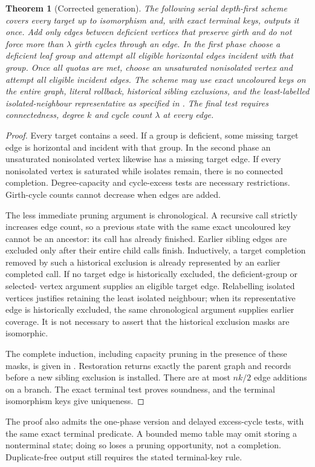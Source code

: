 \documentclass[11pt,a4paper]{article}
\newtheorem{theorem}{Theorem}
\begin{document}
\begin{theorem}[Corrected generation]\label{thm:generation}
The following serial depth-first scheme covers every target up to
isomorphism and, with exact terminal keys, outputs it once. Add only
edges between deficient vertices that preserve girth and do not force
more than $\lambda$ girth cycles through an edge. In the first phase
choose a \emph{deficient leaf group} and attempt all eligible horizontal
edges incident with that group. Once all quotas are met, choose an
unsaturated nonisolated vertex and attempt all eligible incident edges.
The scheme may use exact uncoloured keys on the entire graph, literal
rollback, historical sibling exclusions, and the least-labelled
isolated-neighbour representative as specified in \cite{algorithm}.
The final test requires connectedness, degree $k$ and cycle count
$\lambda$ at every edge.
\end{theorem}
\begin{proof}
Every target contains a seed. If a group is deficient, some missing
target edge is horizontal and incident with that group. In the second
phase an unsaturated nonisolated vertex likewise has a missing target
edge. If every nonisolated vertex is saturated while isolates remain,
there is no connected completion. Degree-capacity and cycle-excess tests
are necessary restrictions. Girth-cycle counts cannot decrease when
edges are added.

The less immediate pruning argument is chronological. A recursive call
strictly increases edge count, so a previous state with the same exact
uncoloured key cannot be an ancestor: its call has already finished.
Earlier sibling edges are excluded only after their entire child calls
finish. Inductively, a target completion removed by such a historical
exclusion is already represented by an earlier completed call. If no
target edge is historically excluded, the deficient-group or selected-
vertex argument supplies an eligible target edge. Relabelling isolated
vertices justifies retaining the least isolated neighbour; when its
representative edge is historically excluded, the same chronological
argument supplies earlier coverage. It is not necessary to assert that
the historical exclusion masks are isomorphic.

The complete induction, including capacity pruning in the presence of
these masks, is given in \cite{algorithm}. Restoration returns exactly
the parent graph and records before a new sibling exclusion is installed.
There are at most $nk/2$ edge additions on a branch. The exact terminal
test proves soundness, and the terminal isomorphism keys give uniqueness.
\end{proof}
The proof also admits the one-phase version and delayed excess-cycle
tests, with the same exact terminal predicate. A bounded memo table may
omit storing a nonterminal state; doing so loses a pruning opportunity,
not a completion. Duplicate-free output still requires the stated
terminal-key rule.
\end{document}
